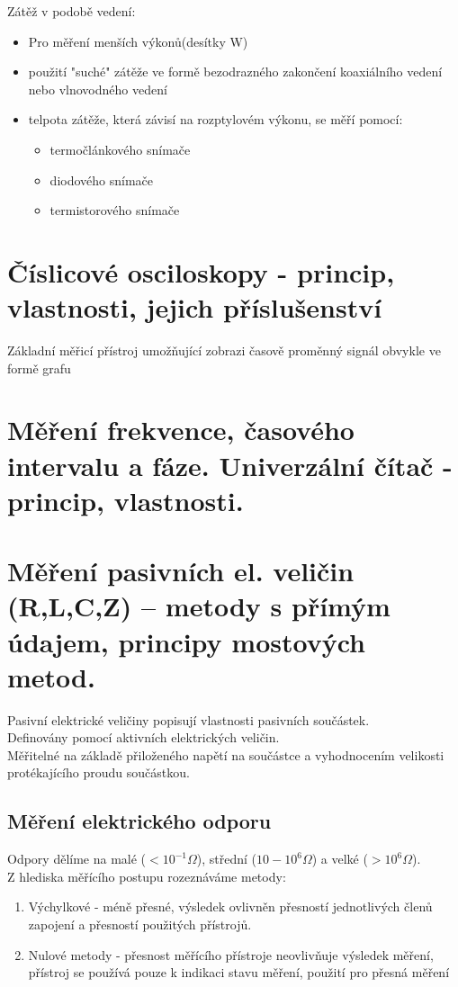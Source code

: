 Zátěž v podobě vedení:
\begin{itemize}
    \item Pro měření menších výkonů(desítky W)
    \item použití "suché" zátěže ve formě bezodrazného zakončení koaxiálního vedení nebo vlnovodného vedení
    \item telpota zátěže, která závisí na rozptylovém výkonu, se měří pomocí:
          \begin{itemize}
              \item termočlánkového snímače
              \item diodového snímače
              \item termistorového snímače
          \end{itemize}
\end{itemize}

\section{Číslicové osciloskopy - princip, vlastnosti, jejich příslušenství}
Základní měřicí přístroj umožňující zobrazi časově proměnný signál obvykle ve formě grafu







\section{Měření frekvence, časového intervalu a fáze. Univerzální čítač - princip, vlastnosti.}

\section{Měření pasivních el. veličin (R,L,C,Z) – metody s přímým údajem, principy mostových metod.}
Pasivní elektrické veličiny popisují vlastnosti pasivních součástek.\\
Definovány pomocí aktivních elektrických veličin.\\
Měřitelné na základě přiloženého napětí na součástce a vyhodnocením velikosti protékajícího proudu součástkou.\\
\subsection{Měření elektrického odporu}
Odpory dělíme na malé (\(<10^{-1}\Omega \)), střední (\(10-10^6\Omega \)) a velké (\(>10^6\Omega \)).\\
Z hlediska měřícího postupu rozeznáváme metody:
\begin{enumerate}
    \item Výchylkové - méně přesné, výsledek ovlivněn přesností jednotlivých členů zapojení a přesností použitých přístrojů.
    \item Nulové metody - přesnost měřícího přístroje neovlivňuje výsledek měření, přístroj se používá pouze k indikaci stavu měření, použití pro přesná měření
\end{enumerate}

